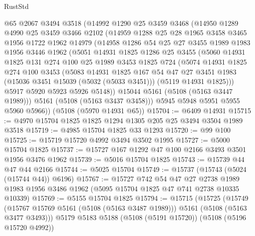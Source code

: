 \begin{lexlean}{RustStd}
\begin{coremodule}
    @65
    @2067
    @3494
    @3518
    (@14992
      @1290
      @25
      @3459
      @3468
      (@14950
        @1289
        @4990
        @25
        @3459
        @3466
        @2102
        (@14959
          @1288
          @25
          @28
          @1965
          @3458
          @3465
          @1956
          @1722
          @1962
          @14979
          (@14958
            @1286
            @54
            @25
            @27
            @3455
            @1989
            @1983
            @1956
            @3446
            @1962
            (@5051
              @14931
              @1825
              @1286
              @25
              @3455
              (@5060
                @14931
                @1825
                @131
                @274
                @100
                @25
                @1989
                @3453
                @1825
                @724
                (@5074
                  @14931
                  @1825
                  @274
                  @100
                  @3453
                  (@5083
                    @14931
                    @1825
                    @167
                    @54
                    @47
                    @27
                    @3451
                    @1983
                    (@15036 @3451 @15039 (@5032 (@5033 @3451)))
                    (@5119 @14931 @1825)))
                @5917
                @5920
                @5923
                @5926
                @5148))
            @15044
            @5161
            (@5108 (@5163 @3447 @1989)))
          @5161
          (@5108 (@5163 @3437 @3458)))
        @5945
        @5948
        @5951
        @5955
        @5960
        @5966))
    (@5108 (@5970 @14931 @65))
@15704 := @6409 @14931
@15715 := @4970 @15704 @1825 @1825 @1294 @1305 @205 @25 @3494 @3504 @1989 @3518
@15719 := @4985 @15704 @1825 @33 @1293
@15720 := @99 @100
@15725 := @15719 @15720 @4992 @3494 @3502 @1995
@15727 := @5000 @15704 @1825
@15737 := @15727 @167 @1292 @47 @100 @2166 @3493 @3501 @1956 @3476 @1962
@15739 := @5016 @15704 @1825
@15743 := @15739 @44 @47 @44 @2166
@15744 := @5025 @15704
@15749 := @15737 (@15743 (@5024 (@15744 @44)) @6196)
@15767 := @15727
    @742
    @54
    @47
    @27
    @2738
    @1989
    @1983
    @1956
    @3486
    @1962
    (@5095 @15704 @1825 @47 @741 @2738 @10335 @10339)
@15769 := @5155 @15704 @1825
@15794 := @15715
    (@15725
      (@15749 (@15767 @15769 @5161 (@5108 (@5163 @3487 @1989))) @5161 (@5108 (@5163 @3477 @3493)))
      @5179
      @5183
      @5188
      (@5108 (@5191 @15720))
      (@5108 (@5196 @15720 @4992))

\end{coremodule}
\end{lexlean}
